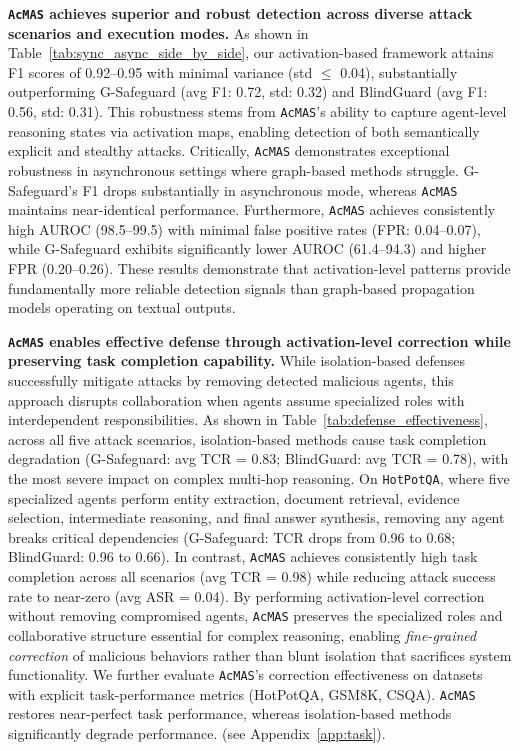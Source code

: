 \documentclass{article}
\newcommand{\app}{\texttt{AcMAS}}
\theoremstyle{plain}
\theoremstyle{definition}
\theoremstyle{remark}
\begin{document}
\textbf{ \app{} achieves superior and robust detection across diverse attack scenarios and execution modes.} As shown in Table~\ref{tab:sync_async_side_by_side}, our activation-based framework attains F1 scores of 0.92--0.95 with minimal variance (std $\leq$ 0.04), substantially outperforming G-Safeguard (avg F1: 0.72, std: 0.32) and BlindGuard (avg F1: 0.56, std: 0.31). This robustness stems from \app{}'s ability to capture agent-level reasoning states via activation maps, enabling detection of both semantically explicit and stealthy attacks. Critically, \app{} demonstrates exceptional robustness in asynchronous settings where graph-based methods struggle. G-Safeguard's F1 drops substantially in asynchronous mode, whereas \app{} maintains near-identical performance. Furthermore, \app{} achieves consistently high AUROC (98.5--99.5) with minimal false positive rates (FPR: 0.04--0.07), while G-Safeguard exhibits significantly lower AUROC (61.4--94.3) and higher FPR (0.20--0.26). These results demonstrate that activation-level patterns provide fundamentally more reliable detection signals than graph-based propagation models operating on textual outputs. 

\textbf{ \app{} enables effective defense through activation-level correction while preserving task completion capability.} While isolation-based 
defenses successfully mitigate attacks by removing detected malicious agents, 
this approach disrupts collaboration when agents assume specialized roles with 
interdependent responsibilities. As shown in Table~\ref{tab:defense_effectiveness}, across all five attack scenarios, isolation-based 
methods cause task completion degradation (G-Safeguard: avg TCR = 0.83; 
BlindGuard: avg TCR = 0.78), with the most severe impact on complex 
multi-hop reasoning. On \texttt{HotPotQA}, where five specialized agents perform 
entity extraction, document retrieval, evidence selection, intermediate reasoning, 
and final answer synthesis, removing any agent breaks critical dependencies 
(G-Safeguard: TCR drops from 0.96 to 0.68; BlindGuard: 0.96 to 
0.66). In contrast, \app{} achieves consistently high task completion 
across all scenarios (avg TCR = 0.98) while reducing attack success rate to near-zero 
(avg ASR = 0.04). By performing activation-level correction without removing 
compromised agents, \app{} preserves the specialized roles and collaborative 
structure essential for complex reasoning, enabling \textit{fine-grained correction} 
of malicious behaviors rather than blunt isolation that sacrifices system 
functionality. We further evaluate \app{}'s correction effectiveness on datasets with explicit task-performance metrics  (HotPotQA, GSM8K, CSQA).
\app{} restores near-perfect task performance, whereas isolation-based methods significantly degrade performance.
(see Appendix~\ref{app:task}).
\end{document}
